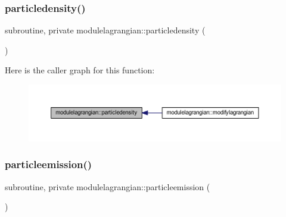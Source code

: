 \subsubsection{\texorpdfstring{particledensity()}{particledensity()}}
{\footnotesize\ttfamily subroutine, private modulelagrangian\+::particledensity (\begin{DoxyParamCaption}{ }\end{DoxyParamCaption})\hspace{0.3cm}{\ttfamily [private]}}

Here is the caller graph for this function\+:\nopagebreak
\begin{figure}[H]
\begin{center}
\leavevmode
\includegraphics[width=350pt]{namespacemodulelagrangian_a7a7e141a39c3a112666d37b0f6db988e_icgraph}
\end{center}
\end{figure}
\mbox{\label{namespacemodulelagrangian_a529648b66afb4cc44ecf46c2557c0c35}} 
\subsubsection{\texorpdfstring{particleemission()}{particleemission()}}
{\footnotesize\ttfamily subroutine, private modulelagrangian\+::particleemission (\begin{DoxyParamCaption}{ }\end{DoxyParamCaption})\hspace{0.3cm}{\ttfamily [private]}}

